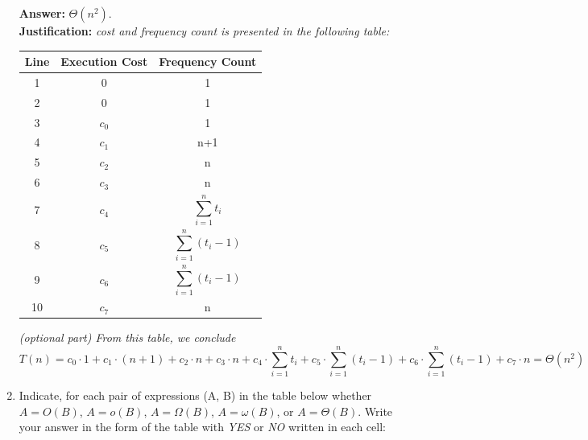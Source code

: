 \documentclass[dvipsnames]{article}
\begin{document}
\begin{enumerate}
\color{blue}
\textbf{Answer:} \emph{$\Theta(n^2)$}. \\
\textbf{Justification: } \emph{cost and frequency count is presented in the following table:} \\
    \begin{minipage}{0.4\textwidth}
      \small
      \begin{tabular}{ c | c | c }
      Line & Execution Cost & Frequency Count \\ 
      \hline
      1 & 0 & 1 \\  
      2 & 0 & 1 \\
      3 & $c_0$ & 1 \\
      4 &  $c_1$   & n+1 \\
      5 &  $c_2$   & n \\
      6 &  $c_3$   & n \\
      7 &  $c_4$   & \[ \sum_{i=1}^{n} t_i \] \\
      8 &  $c_5$  & \[ \sum_{i=1}^{n} (t_i-1) \] \\
      9 &   $c_6$  & \[ \sum_{i=1}^{n} (t_i-1) \] \\
      10 &  $c_7$  & n \\
      \end{tabular}
    \end{minipage}

    \emph{(optional part) From this table, we conclude}
$$T(n) = c_0 \cdot 1 + c_1 \cdot (n+1) + c_2 \cdot n + c_3 \cdot n + c_4 \cdot \sum_{i=1}^{n} t_i + c_5 \cdot \sum_{i=1}^{n} (t_i-1) + c_6 \cdot \sum_{i=1}^{n} (t_i-1) + c_7 \cdot n = \Theta(n^2)$$

\color{black}
  \item Indicate, for each pair of expressions (A, B) in the table below whether $A = O(B)$, $A = o(B)$, $A = \Omega(B)$, $A = \omega(B)$, or $A = \Theta(B)$. Write your answer in the form of the table with \emph{YES} or \emph{NO} written in each cell:


\end{enumerate}
\end{document}
